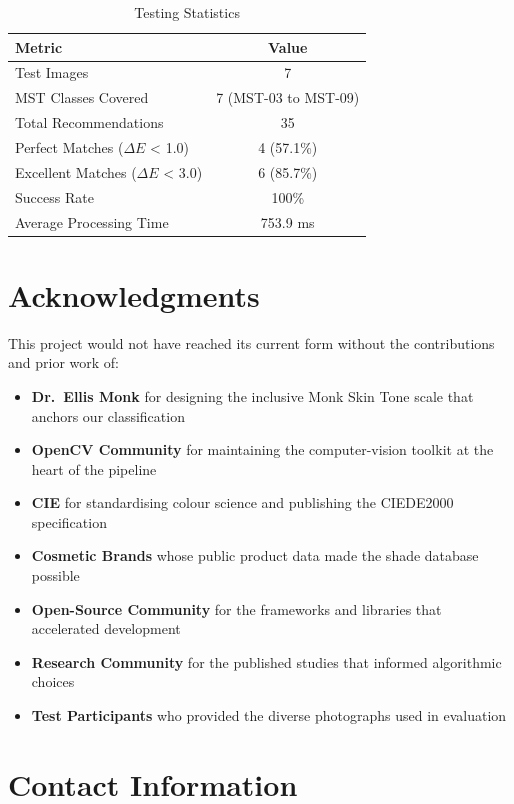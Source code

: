 \begin{table}[h]
\centering
\begin{tabular}{|l|c|}
\hline
\textbf{Metric} & \textbf{Value} \\
\hline
Test Images & 7 \\
MST Classes Covered & 7 (MST-03 to MST-09) \\
Total Recommendations & 35 \\
Perfect Matches ($\Delta E$ < 1.0) & 4 (57.1\%) \\
Excellent Matches ($\Delta E$ < 3.0) & 6 (85.7\%) \\
Success Rate & 100\% \\
Average Processing Time & 753.9 ms \\
\hline
\end{tabular}
\caption{Testing Statistics}
\end{table}

\section{Acknowledgments}

This project would not have reached its current form without the contributions and prior work of:

\begin{itemize}
    \item \textbf{Dr.\ Ellis Monk} for designing the inclusive Monk Skin Tone scale that anchors our classification
    \item \textbf{OpenCV Community} for maintaining the computer-vision toolkit at the heart of the pipeline
    \item \textbf{CIE} for standardising colour science and publishing the CIEDE2000 specification
    \item \textbf{Cosmetic Brands} whose public product data made the shade database possible
    \item \textbf{Open-Source Community} for the frameworks and libraries that accelerated development
    \item \textbf{Research Community} for the published studies that informed algorithmic choices
    \item \textbf{Test Participants} who provided the diverse photographs used in evaluation
\end{itemize}

\section{Contact Information}

